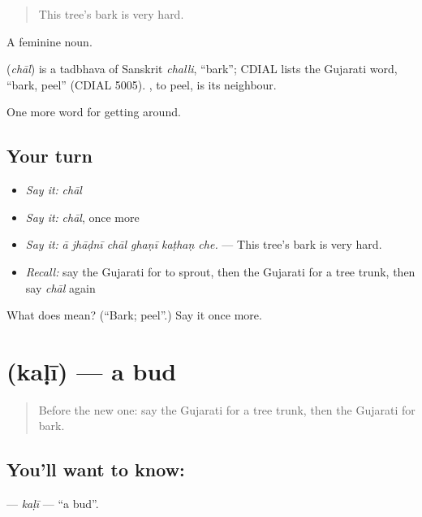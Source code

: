 \begin{quote}
This tree's bark is very hard.
\end{quote}

A feminine noun.

\begin{cousinweb}
\textbf{} (\emph{chāl}) is a tadbhava of Sanskrit \emph{challi}, \textquotedblleft{}bark\textquotedblright{}; CDIAL lists the Gujarati word, \textquotedblleft{}bark, peel\textquotedblright{} (CDIAL 5005). , to peel, is its neighbour.
\end{cousinweb}

\begin{grammarlens}[title={What you've built}]
One more word for getting around.
\end{grammarlens}

\subsection*{Your turn}
\begin{itemize}
\raggedright
  \item \emph{Say it:} \emph{chāl}
  \item \emph{Say it:} \emph{chāl}, once more
  \item \emph{Say it:} \emph{ā jhāḍnī chāl ghaṇī kaṭhaṇ che.} — This tree's bark is very hard.
  \item \emph{Recall:} say the Gujarati for to sprout, then the Gujarati for a tree trunk, then say \emph{chāl} again
\end{itemize}

\begin{tcolorbox}[breakable,colback=teal!4,colframe=teal!35!black,title={Before you move on}]
What does  mean? (\textquotedblleft{}Bark; peel\textquotedblright{}.) Say it once more.
\end{tcolorbox}
\section[\texorpdfstring{\gu{કળી} (kaḷī)}{કળી (kaḷī)}]{ (kaḷī) — a bud}

\label{lesson:GU-C444-kali}



\begin{quote}
Before the new one: say the Gujarati for a tree trunk, then the Gujarati for bark.
\end{quote}

\subsection*{You'll want to know: }
\textbf{} — \emph{kaḷī} — \textquotedblleft{}a bud\textquotedblright{}.

